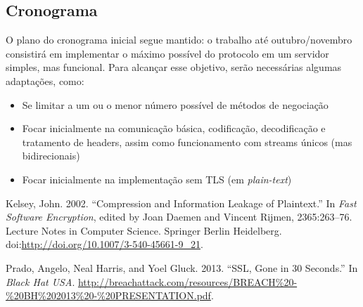 \documentclass[12pt,a4paper,openright,twoside,]{abntex2}	%
\begin{document}
\subsection{Cronograma}\label{cronograma}

O plano do cronograma inicial segue mantido: o trabalho até
outubro/novembro consistirá em implementar o máximo possível do
protocolo em um servidor simples, mas funcional. Para alcançar esse
objetivo, serão necessárias algumas adaptações, como:

\begin{itemize}
\tightlist
\item
  Se limitar a um ou o menor número possível de métodos de negociação\\
\item
  Focar inicialmente na comunicação básica, codificação, decodificação e
  tratamento de headers, assim como funcionamento com streams únicos
  (mas bidirecionais)
\item
  Focar inicialmente na implementação sem TLS (em \emph{plain-text})
\end{itemize}

Kelsey, John. 2002. ``Compression and Information Leakage of
Plaintext.'' In \emph{Fast Software Encryption}, edited by Joan Daemen
and Vincent Rijmen, 2365:263--76. Lecture Notes in Computer Science.
Springer Berlin Heidelberg.
doi:\url{http://doi.org/10.1007/3-540-45661-9_21}.

Prado, Angelo, Neal Harris, and Yoel Gluck. 2013. ``SSL, Gone in 30
Seconds.'' In \emph{Black Hat USA}.
\url{http://breachattack.com/resources/BREACH\%20-\%20BH\%202013\%20-\%20PRESENTATION.pdf}.	%
\end{document}

